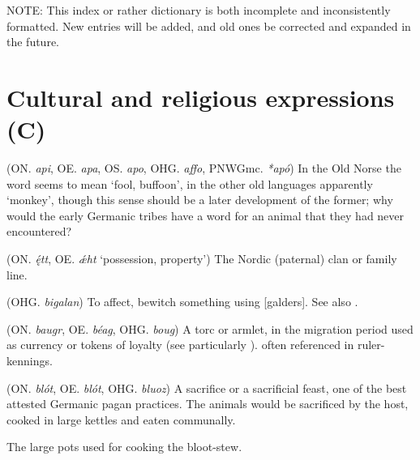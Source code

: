 
NOTE: This index or rather dictionary is both incomplete and inconsistently formatted. New entries will be added, and old ones be corrected and expanded in the future.

\section{Cultural and religious expressions (C)}

\begin{itemize}

 (ON. \emph{api}, OE. \emph{apa}, OS. \emph{apo}, OHG. \emph{affo}, PNWGmc. \emph{*apó})
  In the Old Norse the word seems to mean ‘fool, buffoon’, in the other old languages apparently ‘monkey’, though this sense should be a later development of the former; why would the early Germanic tribes have a word for an animal that they had never encountered?

 (ON. \emph{ę́tt}, OE. \emph{ǽht} ‘possession, property’)
  The Nordic (paternal) clan or family line.

 (OHG. \emph{bigalan})
  To affect, bewitch something using [galders]. See also .

 (ON. \emph{baugr}, OE. \emph{béag}, OHG. \emph{boug})
  A torc or armlet, in the migration period used as currency or tokens of loyalty (see particularly \Hildebrandslied). often referenced in ruler-kennings.

 (ON. \emph{blót}, OE. \emph{blót}, OHG. \emph{bluoz})
  A sacrifice or a sacrificial feast, one of the best attested Germanic pagan practices. The animals would be sacrificed by the host, cooked in large kettles and eaten communally.

  The large pots used for cooking the bloot-stew.


\end{itemize}
